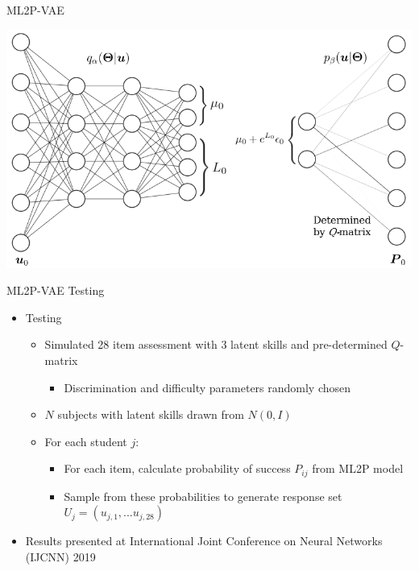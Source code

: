 \documentclass{beamer}
\theoremstyle{definition}
\begin{document}
\begin{frame}{ML2P-VAE}
\begin{center}
  \includegraphics[scale=0.45]{../img/ml2pvae_visual.png}
\end{center}
\end{frame}

\begin{frame}{ML2P-VAE Testing}
\begin{itemize}
  \item Testing
  \begin{itemize}
    \item Simulated 28 item assessment with 3 latent skills and pre-determined $Q$-matrix 
    \begin{itemize}
      \item Discrimination and difficulty parameters randomly chosen 
    \end{itemize}
    \item $N$ subjects with latent skills drawn from $N(0,I)$
    \item<2-> For each student $j$:
    \begin{itemize}
      \item<2-> For each item, calculate probability of success $P_{ij}$ from ML2P model
      \item<2-> Sample from these probabilities to generate response set $U_j = (u_{j,1},...u_{j,28})$
    \end{itemize}
  \end{itemize}
  \item<3-> Results presented at International Joint Conference on Neural Networks (IJCNN) 2019
\end{itemize}
\end{frame}
\end{document}

